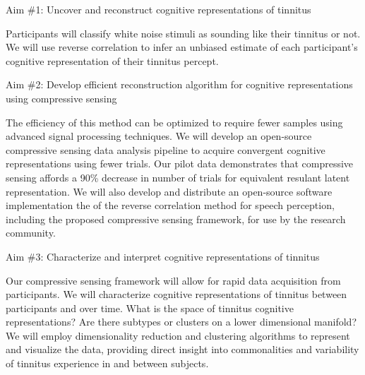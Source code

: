 \documentclass[11pt, notitlepage]{article} %
\begin{document}
\begin{description}
	\item[Aim \#1: Uncover and reconstruct cognitive representations of tinnitus]{} 
\end{description}

Participants will classify white noise stimuli as sounding like their tinnitus or not.
We will use reverse correlation to infer an unbiased estimate of each participant's cognitive representation of their tinnitus percept. 

\begin{description}
	\item[Aim \#2: Develop efficient reconstruction algorithm for cognitive representations using compressive sensing]{} 
\end{description}

The efficiency of this method can be optimized to require fewer samples using advanced signal processing techniques.
We will develop an open-source compressive sensing data analysis pipeline to acquire convergent cognitive representations using fewer trials.
Our pilot data demonstrates that compressive sensing affords a 90\% decrease in number of trials for equivalent resulant latent representation.
We will also develop and distribute an open-source software implementation the of the reverse correlation method for speech perception,
including the proposed compressive sensing framework, for use by the research community.

\begin{description}
	\item[Aim \#3: Characterize and interpret cognitive representations of tinnitus]{} 
\end{description}

Our compressive sensing framework will allow for rapid data acquisition from participants.
We will characterize cognitive representations of tinnitus between participants and over time.
What is the space of tinnitus cognitive representations?
Are there subtypes or clusters on a lower dimensional manifold?
We will employ dimensionality reduction and clustering algorithms to represent and visualize the data,
providing direct insight into commonalities and variability of tinnitus experience in and between subjects.

\end{document}
